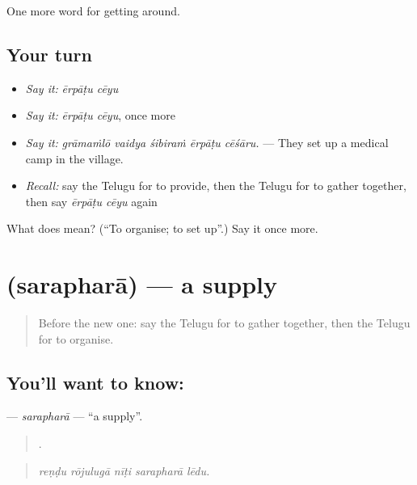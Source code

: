 \begin{grammarlens}[title={What you've built}]
One more word for getting around.
\end{grammarlens}

\subsection*{Your turn}
\begin{itemize}
\raggedright
  \item \emph{Say it:} \emph{ērpāṭu cēyu}
  \item \emph{Say it:} \emph{ērpāṭu cēyu}, once more
  \item \emph{Say it:} \emph{grāmaṁlō vaidya śibiraṁ ērpāṭu cēśāru.} — They set up a medical camp in the village.
  \item \emph{Recall:} say the Telugu for to provide, then the Telugu for to gather together, then say \emph{ērpāṭu cēyu} again
\end{itemize}

\begin{tcolorbox}[breakable,colback=teal!4,colframe=teal!35!black,title={Before you move on}]
What does   mean? (\textquotedblleft{}To organise; to set up\textquotedblright{}.) Say it once more.
\end{tcolorbox}
\section[\texorpdfstring{\te{సరఫరా} (sarapharā)}{సరఫరా (sarapharā)}]{ (sarapharā) — a supply}

\label{lesson:TE-C464-saraphara}



\begin{quote}
Before the new one: say the Telugu for to gather together, then the Telugu for to organise.
\end{quote}

\subsection*{You'll want to know: }
\textbf{} — \emph{sarapharā} — \textquotedblleft{}a supply\textquotedblright{}.

\begin{quote}
    .
\end{quote}

\begin{quote}
\emph{reṇḍu rōjulugā nīṭi sarapharā lēdu.}
\end{quote}

